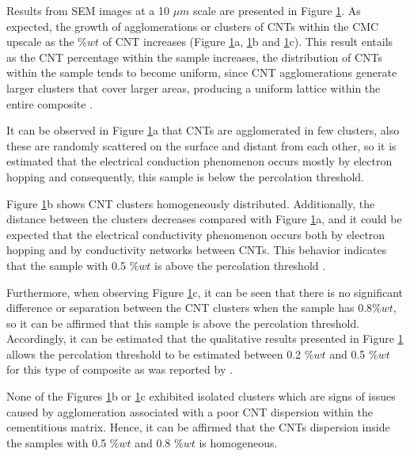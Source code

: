 \documentclass[twocolumn]{bmcart}%
\begin{document}
Results from SEM images at a 10 $\mu m$ scale are presented in Figure \ref{fig7}. As expected, the growth of agglomerations or clusters of CNTs within the CMC upscale as the $\%wt$ of CNT increases (Figure \ref{fig7}a, \ref{fig7}b and \ref{fig7}c). This result entails as the CNT percentage within the sample increases, the distribution of CNTs within the sample tends to become uniform, since CNT agglomerations generate larger clusters that cover larger areas, producing a uniform lattice within the entire composite \cite{Garcia-Macias2017, Nam2015}.

\begin{figure}[h!]
  \caption{
      }
      \label{fig7}
      \end{figure}


It can be observed in Figure \ref{fig7}a that CNTs are agglomerated in few clusters, also these are randomly scattered on the surface and distant from each other, so it is estimated that the electrical conduction phenomenon occurs mostly by electron hopping \cite{Balberg1984, Garcia-Macias2017} and consequently, this sample is below the percolation threshold.

Figure \ref{fig7}b shows CNT clusters homogeneously distributed. Additionally, the distance between the clusters decreases compared with Figure \ref{fig7}a, and it could be expected that the electrical conductivity phenomenon occurs both by electron hopping and by conductivity networks between CNTs. This behavior indicates that the sample with 0.5 $\%wt$ is above the percolation threshold \cite{Balberg1984, Garcia-Macias2017}.

Furthermore, when observing Figure \ref{fig7}c, it can be seen that there is no significant difference or separation between the CNT clusters when the sample has 0.8$\%wt$, so it can be affirmed that this sample is above the percolation threshold. Accordingly, it can be estimated that the qualitative results presented in Figure \ref{fig7} allows the percolation threshold to be estimated between 0.2 $\%wt$ and 0.5 $\%wt$ for this type of composite as was reported by \cite{Souri2017, Garcia-Macias2017, Hoseini2017}. 

None of the Figures \ref{fig7}b or \ref{fig7}c exhibited isolated clusters which are signs of issues caused by agglomeration associated with a poor CNT dispersion within the cementitious matrix. Hence, it can be affirmed that the CNTs dispersion inside the samples with 0.5 $\%wt$ and 0.8 $\%wt$ is homogeneous. 
\end{document}
